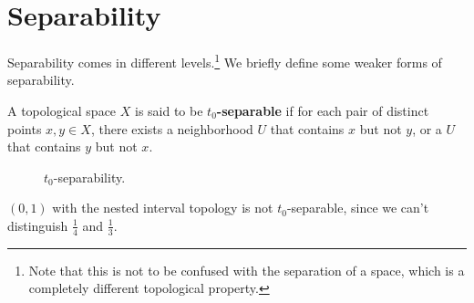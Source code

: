 \section{Separability}

  Separability comes in different levels.\footnote{Note that this is not to be confused with the separation of a space, which is a completely different topological property.} We briefly define some weaker forms of separability. 
  
  \begin{definition}[$t_0$-Separability]
    \label{def:t0-separability}
    A topological space $X$ is said to be \textbf{$t_0$-separable} if for each pair of distinct points $x, y \in X$, there exists a neighborhood $U$ that contains $x$ but not $y$, or a $U$ that contains $y$ but not $x$. 

    \begin{figure}[H]
      \centering 
      \caption{$t_0$-separability. } 
      \label{fig:t0_separability}
    \end{figure}
  \end{definition}

  \begin{example}
    \label{ex:nested-interval-topology-is-not-t0}
    $(0,1)$ with the nested interval topology is not $t_0$-separable, since we can't distinguish $\frac{1}{4}$ and $\frac{1}{3}$.
  \end{example}

